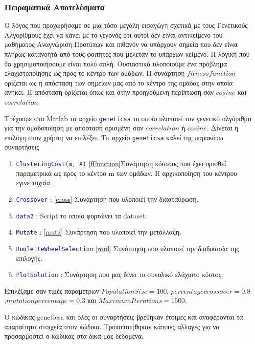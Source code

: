  \subsubsection{Πειραματικά Αποτελέσματα}
 
 Ο λόγος που προχωρήσαμε σε μια τόσο μεγάλη εισαγώγη σχετικά με τους Γενετικούς Αλγορίθμους έχει να κάνει με το γεγονός ότι αυτοί δεν είναι αντικείμενο του μαθήματος Αναγνώριση Προτύπων και πιθανόν να υπάρχουν σημεία που δεν είναι πλήρως κατανοητά από τους φοιτητές που μελετάν το υπάρχων κείμενο. Η λογική που θα χρησιμοποιήσουμε είναι πολύ απλή. Ουσιαστικά υλοποιούμε ένα πρόβλημα ελαχιστοποίησης ως προς το κέντρο των ομάδων. Η συνάρτηση $fitness function$ ορίζεται ως η απόσταση των σημείων μας από το κέντρο της ομάδας στην οποία ανήκει. H απόσταση ορίζεται όπως και στην προηγούμενη περίπτωση σαν $cosine$ και $correlation$.
 
 Τρέχουμε στο Matlab το αρχείο \lstinline[language=MATLAB]!geneticsa! το οποίο υλοποιεί τον γενετικό αλγόριθμο για την ομαδοποίηση με απόσταση ορισμένη σαν $correlation$ ή $cosine$. Δίνεται η επιλόγη στον χρήστη να επιλέξει. Το αρχείο \lstinline[language=MATLAB]!geneticsa! καλεί της παρακάτω συναρτήσεις
 \begin{enumerate}
 	\item \lstinline[language=MATLAB]!ClusteringCost(m, X)!
 	\ref{fFunction}{Συνάρτηση κόστους} που έχει ορισθεί παραμετρικά ως προς το κέντρο m των ομάδων. Η αρχικοποίηση του κέντρου έγινε τυχαία.
 	\item \lstinline[language=MATLAB]!Crossover! : \ref{cross} Συνάρτηση που υλοποιεί την διασταύρωση.
 	\item  \lstinline[language=MATLAB]!data2! : Script το οποίο φορτώνει τα dataset.
 	\item  \lstinline[language=MATLAB]!Mutate! : \ref{muta} Συνάρτηση που υλοποιεί την μετάλλαξη.
 	\item \lstinline[language=MATLAB]!RouletteWheelSelection! \ref{roul} Συνάρτηση που υλοποιεί την διαδικασία της επιλογής.
 	\item \lstinline[language=MATLAB]!PlotSolution! : Συνάρτηση που μας δίνει το συνολικό ελάχιστο κόστος.
 \end{enumerate}  
 
 Επιλέξαμε σαν τιμές παραμέτρων $Population Size =100$, $percentage crossover=0.8$,$mutation percentage=0.3$ και $Maximum Iterations=1500$.
 
 Ο κώδικας geneticsa και όλες οι συναρτήσεις βρέθηκαν έτοιμες και αναφέρονται τα απαραίτητα στοιχεία στον κώδικα. Τροποποιήθηκαν κάποιες αλλαγές για να προσαρμοστεί ο κώδικας στα δικά μας δεδομένα.
 
